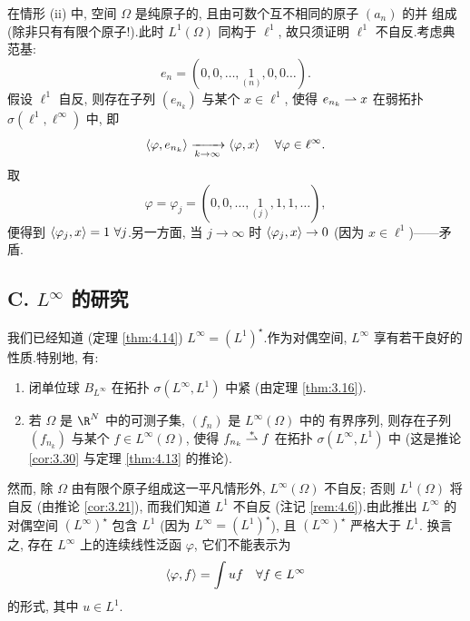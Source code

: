 \begin{keyremark}
在情形 (ii) 中, 空间 $\Omega$ 是纯原子的, 且由可数个互不相同的原子 $(a_n)$ 的并
组成 (除非只有有限个原子!).此时 $L^1(\Omega)$ 同构于 $\ell^1$, 故只须证明
$\ell^1$ 不自反.考虑典范基:
\begin{equation*}
e_n=(0,0,\dots,\underset{(n)}1,0,0\dots).
\end{equation*}
假设 $\ell^1$ 自反, 则存在子列 $(e_{n_k})$ 与某个 $x\in\ell^1$, 使得
$e_{n_k}\rightharpoonup x$ 在弱拓扑 $\sigma(\ell^1,\ell^\infty)$ 中, 即
\begin{equation*}
\left\langle \varphi,e_{n_k}\right\rangle\xrightarrow[k\to\infty]{}\left\langle \varphi,x\right\rangle
\quad\forall\varphi\in\ell^\infty.
\end{equation*}
取
\begin{equation*}
\varphi=\varphi_j=(0,0,\dots,\underset{(j)}1,1,1,\dots),
\end{equation*}
便得到 $\left\langle \varphi_j,x\right\rangle=1\ \forall j$.另一方面, 当 $j\to\infty$ 时
$\left\langle \varphi_j,x\right\rangle\to0$ (因为 $x\in\ell^1$)——矛盾.
\end{keyremark}

\subsection*{C. $L^\infty$ 的研究}

我们已经知道 (定理  \ref{thm:4.14}) $L^\infty=(L^1)^\star$.作为对偶空间,
$L^\infty$ 享有若干良好的性质.特别地, 有:

\begin{enumerate}[label=(\roman*), leftmargin=2.6em, itemsep=0.2em]
	\item 闭单位球 $B_{L^\infty}$ 在\wstar{}拓扑 $\sigma(L^\infty,L^1)$ 中紧
	      (由定理  \ref{thm:3.16}).
	\item 若 $\Omega$ 是 $\R^N$ 中的可测子集, $(f_n)$ 是 $L^\infty(\Omega)$ 中的
	      有界序列, 则存在子列 $(f_{n_k})$ 与某个 $f\in L^\infty(\Omega)$, 使得
	      $f_{n_k}\overset{*}{\rightharpoonup} f$ 在\wstar{}拓扑 $\sigma(L^\infty,L^1)$ 中 (这是推论
	       \ref{cor:3.30} 与定理  \ref{thm:4.13} 的推论).
\end{enumerate}

然而, 除 $\Omega$ 由有限个原子组成这一平凡情形外, $L^\infty(\Omega)$ 不自反;
否则 $L^1(\Omega)$ 将自反 (由推论  \ref{cor:3.21}), 而我们知道 $L^1$ 不自反
(注记 \ref{rem:4.6}).由此推出 $L^\infty$ 的对偶空间 $(L^\infty)^\star$ 包含
$L^1$ (因为 $L^\infty=(L^1)^\star$), 且 $(L^\infty)^\star$ 严格大于 $L^1$.
换言之, 存在 $L^\infty$ 上的连续线性泛函 $\varphi$, 它们不能表示为
\begin{equation*}
\left\langle \varphi,f\right\rangle=\int uf\quad\forall f\in L^\infty
\end{equation*}
的形式, 其中 $u\in L^1$.

